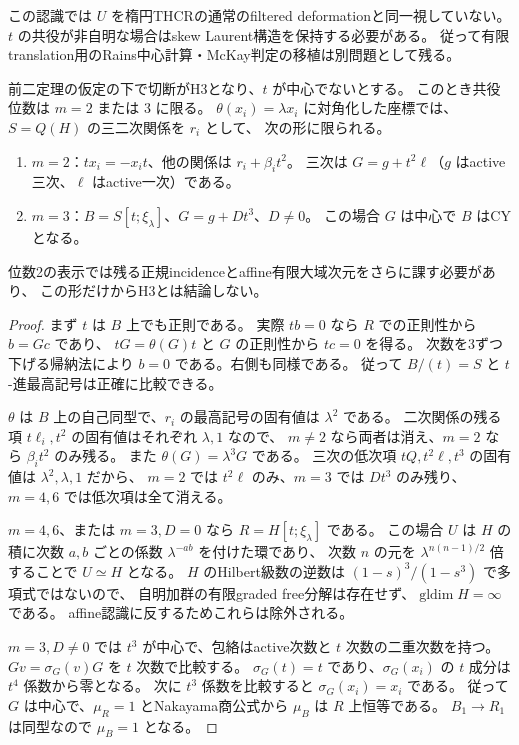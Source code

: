 この認識では $U$ を楕円THCRの通常のfiltered deformationと同一視していない。
$t$ の共役が非自明な場合はskew Laurent構造を保持する必要がある。
従って有限translation用のRains中心計算・McKay判定の移植は別問題として残る。

\begin{theorem}
\label{thm:normal-elliptic-two-three}
前二定理の仮定の下で切断がH3となり、$t$ が中心でないとする。
このとき共役位数は $m=2$ または $3$ に限る。
$\theta(x_i)=\lambda x_i$ に対角化した座標では、$S=Q(H)$ の三二次関係を $r_i$ として、
次の形に限られる。
\begin{enumerate}
\item $m=2$：$tx_i=-x_it$、他の関係は $r_i+\beta_it^2$。
三次は $G=g+t^2\ell$（$g$ はactive三次、$\ell$ はactive一次）である。
\item $m=3$：$B=S[t;\xi_\lambda]$、$G=g+Dt^3$、$D\ne0$。
この場合 $G$ は中心で $B$ はCYとなる。
\end{enumerate}
位数2の表示では残る正規incidenceとaffine有限大域次元をさらに課す必要があり、
この形だけからH3とは結論しない。
\end{theorem}
\begin{proof}
まず $t$ は $B$ 上でも正則である。
実際 $tb=0$ なら $R$ での正則性から $b=Gc$ であり、
$tG=\theta(G)t$ と $G$ の正則性から $tc=0$ を得る。
次数を3ずつ下げる帰納法により $b=0$ である。右側も同様である。
従って $B/(t)=S$ と $t$-進最高記号は正確に比較できる。

$\theta$ は $B$ 上の自己同型で、$r_i$ の最高記号の固有値は $\lambda^2$ である。
二次関係の残る項 $t\ell_i,t^2$ の固有値はそれぞれ $\lambda,1$ なので、
$m\ne2$ なら両者は消え、$m=2$ なら $\beta_i t^2$ のみ残る。
また $\theta(G)=\lambda^3G$ である。
三次の低次項 $tQ,t^2\ell,t^3$ の固有値は $\lambda^2,\lambda,1$ だから、
$m=2$ では $t^2\ell$ のみ、$m=3$ では $Dt^3$ のみ残り、
$m=4,6$ では低次項は全て消える。

$m=4,6$、または $m=3,D=0$ なら $R=H[t;\xi_\lambda]$ である。
この場合 $U$ は $H$ の積に次数 $a,b$ ごとの係数 $\lambda^{-ab}$ を付けた環であり、
次数 $n$ の元を $\lambda^{n(n-1)/2}$ 倍することで $U\simeq H$ となる。
$H$ のHilbert級数の逆数は $(1-s)^3/(1-s^3)$ で多項式ではないので、
自明加群の有限graded free分解は存在せず、$\operatorname{gldim}H=\infty$ である。
affine認識に反するためこれらは除外される。

$m=3,D\ne0$ では $t^3$ が中心で、包絡はactive次数と $t$ 次数の二重次数を持つ。
$Gv=\sigma_G(v)G$ を $t$ 次数で比較する。
$\sigma_G(t)=t$ であり、$\sigma_G(x_i)$ の $t$ 成分は $t^4$ 係数から零となる。
次に $t^3$ 係数を比較すると $\sigma_G(x_i)=x_i$ である。
従って $G$ は中心で、$\mu_R=1$ とNakayama商公式から
$\mu_B$ は $R$ 上恒等である。
$B_1\to R_1$ は同型なので $\mu_B=1$ となる。
\end{proof}

